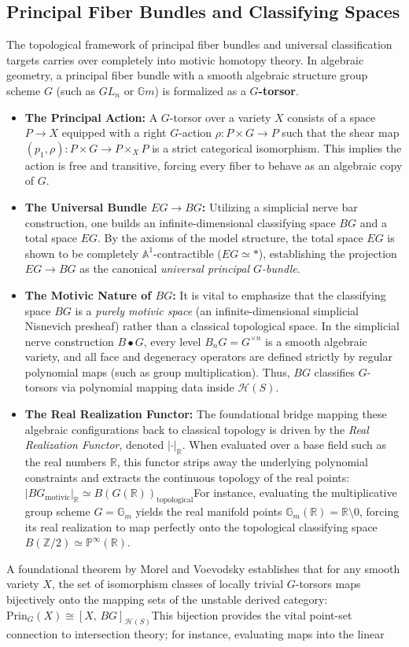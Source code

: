\documentclass[11pt,oneside]{article}
\begin{document}
\subsection{Principal Fiber Bundles and Classifying Spaces}The topological framework of principal fiber bundles and universal classification targets carries over completely into motivic homotopy theory. In algebraic geometry, a principal fiber bundle with a smooth algebraic structure group scheme $G$ (such as $GL_n$ or $\mathbb{G}m$) is formalized as a \textbf{$G$-torsor}.\begin{itemize}\item \textbf{The Principal Action:} A $G$-torsor over a variety $X$ consists of a space $P \to X$ equipped with a right $G$-action $\rho: P \times G \to P$ such that the shear map $(p_1, \rho): P \times G \to P \times_X P$ is a strict categorical isomorphism. This implies the action is free and transitive, forcing every fiber to behave as an algebraic copy of $G$.\item \textbf{The Universal Bundle $EG \to BG$:} Utilizing a simplicial nerve bar construction, one builds an infinite-dimensional classifying space $BG$ and a total space $EG$. By the axioms of the model structure, the total space $EG$ is shown to be completely $\mathbb{A}^1$-contractible ($EG \simeq *$), establishing the projection $EG \to BG$ as the canonical \emph{universal principal $G$-bundle}.\item \textbf{The Motivic Nature of $BG$:} It is vital to emphasize that the classifying space $BG$ is a \emph{purely motivic space} (an infinite-dimensional simplicial Nisnevich presheaf) rather than a classical topological space. In the simplicial nerve construction $B{\bullet}G$, every level $B_nG = G^{\times n}$ is a smooth algebraic variety, and all face and degeneracy operators are defined strictly by regular polynomial maps (such as group multiplication). Thus, $BG$ classifies $G$-torsors via polynomial mapping data inside $\mathcal{H}(S)$.\item \textbf{The Real Realization Functor:} The foundational bridge mapping these algebraic configurations back to classical topology is driven by the \emph{Real Realization Functor}, denoted $|\cdot|_\mathbb{R}$. When evaluated over a base field such as the real numbers $\mathbb{R}$, this functor strips away the underlying polynomial constraints and extracts the continuous topology of the real points:\(|BG_{\text{motivic}}|_{\mathbb{R}}\simeq B(G(\mathbb{R}))_{\text{topological}}\)For instance, evaluating the multiplicative group scheme $G = \mathbb{G}_m$ yields the real manifold points $\mathbb{G}_m(\mathbb{R}) = \mathbb{R} \setminus {0}$, forcing its real realization to map perfectly onto the topological classifying space $B(\mathbb{Z}/2) \simeq \mathbb{P}^\infty(\mathbb{R}).$\end{itemize}A foundational theorem by Morel and Voevodsky establishes that for any smooth variety $X$, the set of isomorphism classes of locally trivial $G$-torsors maps bijectively onto the mapping sets of the unstable derived category:\(\text{Prin}_{G}(X)\cong [X,\,BG]_{\mathcal{H}(S)}\)This bijection provides the vital point-set connection to intersection theory; for instance, evaluating maps into the linear 
\end{document}
